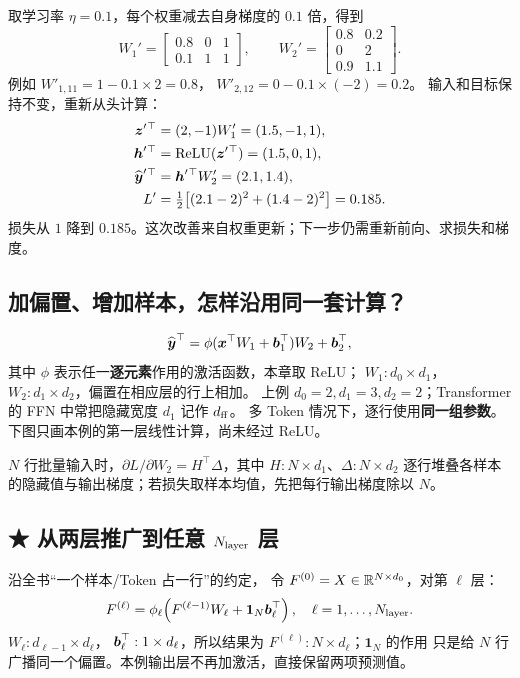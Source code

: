 取学习率 $\eta=0.1$，每个权重减去自身梯度的 $0.1$ 倍，得到
\[
W_1'=\begin{bmatrix}0.8&0&1\\0.1&1&1\end{bmatrix},\qquad
W_2'=\begin{bmatrix}0.8&0.2\\0&2\\0.9&1.1\end{bmatrix}.
\]
例如 $W'_{1,11}=1-0.1\times2=0.8$，
$W'_{2,12}=0-0.1\times(-2)=0.2$。
输入和目标保持不变，重新从头计算：
\[
\begin{aligned}
\boldsymbol{z}'{}^\top&=(2,-1)W_1'=(1.5,-1,1),\\
\boldsymbol{h}'{}^\top&=\operatorname{ReLU}(\boldsymbol{z}'{}^\top)=(1.5,0,1),\\
\widehat{\boldsymbol{y}}'{}^\top&=\boldsymbol{h}'{}^\top W_2'=(2.1,1.4),\\
L'&=\tfrac12\bigl[(2.1-2)^2+(1.4-2)^2\bigr]=0.185.
\end{aligned}
\]
损失从 $1$ 降到 $0.185$。这次改善来自权重更新；下一步仍需重新前向、求损失和梯度。


\subsection{加偏置、增加样本，怎样沿用同一套计算？}
\label{partq:matrices}
\begin{equation}
\widehat{\boldsymbol{y}}^\top
=\phi(\boldsymbol{x}^\top W_1+\boldsymbol{b}_1^\top)W_2+\boldsymbol{b}_2^\top,
\label{eq:mlp-standard}
\end{equation}
其中 $\phi$ 表示任一\textbf{逐元素}作用的激活函数，本章取 ReLU；
$W_1:d_0\times d_1$，$W_2:d_1\times d_2$，偏置在相应层的行上相加。
上例 $d_0=2,d_1=3,d_2=2$；Transformer 的 FFN 中常把隐藏宽度 $d_1$ 记作 $d_{\rm ff}$。
多 Token 情况下，逐行使用\textbf{同一组参数}。下图只画本例的第一层线性计算，尚未经过 ReLU。



$N$ 行批量输入时，$\partial L/\partial W_2=H^\top\Delta$，其中 $H:N\times d_1$、$\Delta:N\times d_2$ 逐行堆叠各样本的隐藏值与输出梯度；若损失取样本均值，先把每行输出梯度除以 $N$。

\subsection{\texorpdfstring{{\symboliconfont ★} 从两层推广到任意 $N_{\rm layer}$ 层}{★ 从两层推广到任意层数}}

沿全书“一个样本/Token 占一行”的约定，
令 $F^{(0)}=X\in\mathbb{R}^{N\times d_0}$，对第 $\ell$ 层：
\begin{equation}
F^{(\ell)}
=\phi_\ell\!\left(F^{(\ell-1)}W_\ell+
\mathbf1_N\boldsymbol{b}_\ell^\top\right),\quad \ell=1,\ldots,N_{\rm layer}.
\label{eq:mlp-l-layer-row}
\end{equation}
$W_\ell:d_{\ell-1}\times d_\ell$，
$\boldsymbol{b}_\ell^\top:1\times d_\ell$，所以结果为
$F^{(\ell)}:N\times d_\ell$；$\mathbf1_N$ 的作用
只是给 $N$ 行广播同一个偏置。本例输出层不再加激活，直接保留两项预测值。

